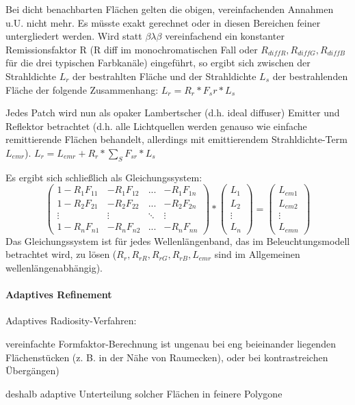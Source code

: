 \documentclass[landscape]{article}
\begin{document}
\begin{multicols}{3}
  Bei dicht benachbarten Flächen gelten die obigen, vereinfachenden Annahmen u.U. nicht mehr. Es müsste exakt gerechnet oder in diesen Bereichen feiner untergliedert werden. 
  Wird statt $\beta \lambda \beta$ vereinfachend ein konstanter Remissionsfaktor R (R diff im monochromatischen Fall oder $R_{diff R}, R_{diffG}, R_{diffB}$ für die drei typischen Farbkanäle) eingeführt, so ergibt sich zwischen der Strahldichte $L_r$ der bestrahlten Fläche und der Strahldichte $L_s$ der bestrahlenden Fläche der folgende Zusammenhang: $L_r=R_r*F_sr*L_s$
  
  Jedes Patch wird nun als opaker Lambertscher (d.h. ideal diffuser) Emitter und Reflektor betrachtet (d.h. alle Lichtquellen werden genauso wie einfache remittierende Flächen behandelt, allerdings mit emittierendem Strahldichte-Term $L_{emr}$). $L_r=L_{emr}+R_r*\sum_S F_{sr}*L_s$
  
  Es ergibt sich schließlich als Gleichungssystem:
  $$ \begin{pmatrix} 1-R_1F_{11} & -R_1F_{12} &...& -R_1F_{1n}\\ 1-R_2F_{21} & -R_2F_{22} &...& -R_2F_{2n}\\ \vdots & \vdots & \ddots & \vdots \\ 1-R_nF_{n1} & -R_nF_{n2} &...& -R_nF_{nn} \end{pmatrix} * \begin{pmatrix} L_1\\L_2\\\vdots\\L_n \end{pmatrix} = \begin{pmatrix} L_{em1}\\L_{em2}\\\vdots\\L_{emn} \end{pmatrix}$$
  Das Gleichungssystem ist für jedes Wellenlängenband, das im Beleuchtungsmodell betrachtet wird, zu lösen ($R_r, R_{rR}, R_{rG}, R_{rB}, L_{emr}$ sind im Allgemeinen wellenlängenabhängig).
  
  \paragraph{Adaptives Refinement}
  Adaptives Radiosity-Verfahren:
  \begin{itemize*}
    \item vereinfachte Formfaktor-Berechnung ist ungenau bei eng beieinander liegenden Flächenstücken (z. B. in der Nähe von Raumecken), oder bei kontrastreichen Übergängen)
    \item deshalb adaptive Unterteilung solcher Flächen in feinere Polygone
  \end{itemize*}
  

\end{multicols}
\end{document}
